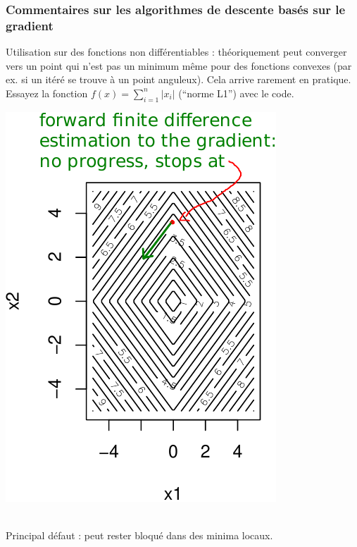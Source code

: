 \documentclass[12pt]{beamer}
\begin{document}
\begin{frame}
\frametitle{Commentaires sur les algorithmes de descente basés sur le gradient} 
\begin{minipage}[c]{0.5\textwidth}
Utilisation sur des fonctions non différentiables : théoriquement peut converger vers un point qui n’est pas un minimum même pour des fonctions convexes (par ex. si un itéré se trouve à un point anguleux). Cela arrive rarement en pratique. 
Essayez la fonction $f(x) = \sum_{i=1}^n |x_i|$ (``norme L1'') avec le code. 
\end{minipage}
\begin{minipage}[c]{0.4\textwidth}
\includegraphics[width=\textwidth]{L1norm_contour-premconv-crop.pdf} 
\end{minipage}
\\
Principal défaut : peut rester bloqué dans des minima locaux.
\end{frame}
\end{document}

